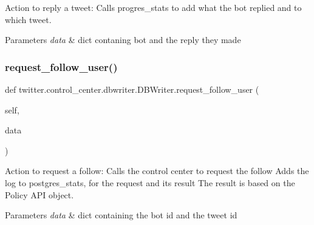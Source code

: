 Action to reply a tweet\+: Calls progres\+\_\+stats to add what the bot replied and to which tweet. 


\begin{DoxyParams}{Parameters}
{\em data} & dict contaning bot and the reply they made \\
\hline
\end{DoxyParams}
\mbox{\label{classtwitter_1_1control__center_1_1dbwriter_1_1DBWriter_a957daaa2da31d56fc7dccb9a18f3346d}} 
\subsubsection{\texorpdfstring{request\+\_\+follow\+\_\+user()}{request\_follow\_user()}}
{\footnotesize\ttfamily def twitter.\+control\+\_\+center.\+dbwriter.\+D\+B\+Writer.\+request\+\_\+follow\+\_\+user (\begin{DoxyParamCaption}\item[{}]{self,  }\item[{}]{data }\end{DoxyParamCaption})}



Action to request a follow\+: Calls the control center to request the follow Adds the log to postgres\+\_\+stats, for the request and its result The result is based on the Policy A\+PI object. 


\begin{DoxyParams}{Parameters}
{\em data} & dict containing the bot id and the tweet id \\
\hline
\end{DoxyParams}
\mbox{\label{classtwitter_1_1control__center_1_1dbwriter_1_1DBWriter_af94a869d95d271c9fc1d23b9281c95a9}} 
